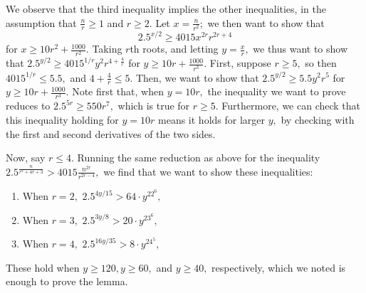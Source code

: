 \documentclass{article}
\theoremstyle{definition}
\theoremstyle{remark}
\begin{document}
We observe that the third inequality implies the other inequalities, in the assumption that $\frac{n}{r} \geq 1$ and $r \geq 2.$ Let $x = \frac{n}{r^2};$ we then want to show that $$2.5^{x/2} \geq 4015 x^{2r} r^{2r + 4}$$ for $x \geq 10r^2 + \frac{1000}{r^2}.$ Taking $r$th roots, and letting $y = \frac{x}{r},$ we thus want to show that $2.5^{y/2} \geq 4015^{1/r} y^2 r^{4 + \frac{4}{r}}$ for $y \geq 10r + \frac{1000}{r^3}.$ First, suppose $r \geq 5,$ so then $4015^{1/r} \leq 5.5,$ and $4 + \frac{4}{r} \leq 5.$ Then, we want to show that $2.5^{y/2} \geq 5.5y^2r^5$ for $y \geq 10r + \frac{1000}{r^3}.$ Note first that, when $y = 10r,$ the inequality we want to prove reduces to $2.5^{5r} \geq 550 r^7,$ which is true for $r \geq 5.$ Furthermore, we can check that this inequality holding for $y = 10r$ means it holds for larger $y,$ by checking with the first and second derivatives of the two sides.
\par Now, say $r \leq 4.$ Running the same reduction as above for the inequality $2.5^{\frac{n}{r^2 + 4r + 3}} > 4015 \frac{n^{2r}}{r^{2r - 4}},$ we find that we want to show these inequalities:
\begin{enumerate}
    \item When $r = 2,$ $2.5^{4y/15} > 64 \cdot y^22^6,$
    \item When $r = 3,$ $2.5^{3y/8} > 20 \cdot y^23^6,$
    \item When $r = 4,$ $2.5^{16y/35} > 8 \cdot y^24^5,$
\end{enumerate}
These hold when $y \geq 120, y \geq 60,$ and $y \geq 40,$ respectively, which we noted is enough to prove the lemma.

\printbibliography
\end{document}
